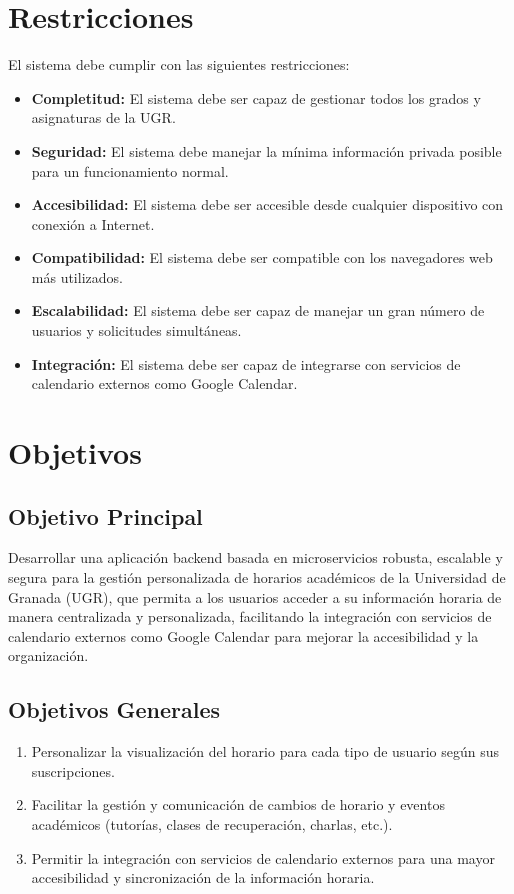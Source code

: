 \section{Restricciones}

El sistema debe cumplir con las siguientes restricciones:

\begin{itemize}
    \item \textbf{Completitud:} El sistema debe ser capaz de gestionar todos los grados y asignaturas de la UGR.
    \item \textbf{Seguridad:} El sistema debe manejar la mínima información privada posible para un funcionamiento normal.
    \item \textbf{Accesibilidad:} El sistema debe ser accesible desde cualquier dispositivo con conexión a Internet.
    \item \textbf{Compatibilidad:} El sistema debe ser compatible con los navegadores web más utilizados.
    \item \textbf{Escalabilidad:} El sistema debe ser capaz de manejar un gran número de usuarios y solicitudes simultáneas.
    \item \textbf{Integración:} El sistema debe ser capaz de integrarse con servicios de calendario externos como Google Calendar.
\end{itemize}

\section{Objetivos}

\subsection{Objetivo Principal}

Desarrollar una aplicación backend basada en microservicios robusta, escalable y segura para la gestión personalizada de horarios académicos de la Universidad de Granada (UGR), que permita a los usuarios acceder a su información horaria de manera centralizada y personalizada, facilitando la integración con servicios de calendario externos como Google Calendar para mejorar la accesibilidad y la organización.

\subsection{Objetivos Generales}

\begin{enumerate}
    \item Personalizar la visualización del horario para cada tipo de usuario según sus suscripciones.
    \item Facilitar la gestión y comunicación de cambios de horario y eventos académicos (tutorías, clases de recuperación, charlas, etc.).
    \item Permitir la integración con servicios de calendario externos para una mayor accesibilidad y sincronización de la información horaria.
\end{enumerate}


